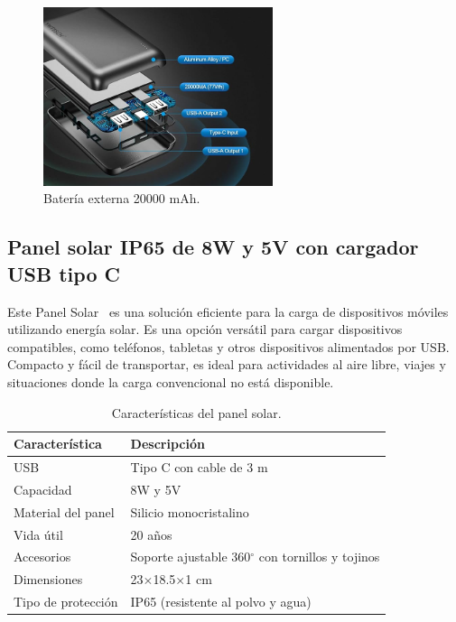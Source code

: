 \begin{figure}[h]
    \centering
    \includegraphics[width=0.6\textwidth]{img/herramientas/bateria_externa_descripcion.png}
    \caption{Batería externa 20000 mAh.} \label{Img:BateriaExterna}
\end{figure}

\subsection{Panel solar IP65 de 8W y 5V con cargador USB tipo C}
Este Panel Solar~\cite{misc:PanelSolar} es una solución eficiente para la carga de dispositivos móviles utilizando energía solar. Es una opción versátil para cargar dispositivos compatibles, como teléfonos, tabletas y otros dispositivos alimentados por USB. Compacto y fácil de transportar, es ideal para actividades al aire libre, viajes y situaciones donde la carga convencional no está disponible.

\begin{table}[htbp]
\begin{center}
\caption{Características del panel solar.}
\begin{tabular}{|l|l|} %
\hline
\rowcolor[HTML]{C0C0C0} 
\textbf{Característica} & \textbf{Descripción}\\ \hline
USB & Tipo C con cable de 3 m \\ \hline
Capacidad & 8W y 5V \\ \hline
Material del panel & Silicio monocristalino \\ \hline
Vida útil & 20 años \\ \hline
Accesorios & Soporte ajustable 360$^\circ$ con tornillos y tojinos \\ \hline
Dimensiones & 23$\times$18.5$\times$1 cm\\ \hline
Tipo de protección & IP65 (resistente al polvo y agua)\\ \hline
\end{tabular}
\end{center}
\end{table}

